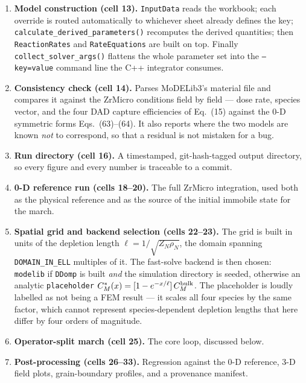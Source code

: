 \documentclass[11pt]{article}
\newcommand{\ZrM}{\textsf{ZrMicro}}
\newcommand{\MoD}{\textsf{MoDELib3}}
\newcommand{\code}[1]{\texttt{\small #1}}
\newcommand{\dref}[1]{Eq.~(#1)}
\newcommand{\drefs}[2]{Eqs.~(#1)--(#2)}
\begin{document}
\begin{enumerate}
\item \textbf{Model construction (cell 13).} \code{InputData} reads the workbook;
each override is routed automatically to whichever sheet already defines the key;
\code{calculate\_derived\_parameters()} recomputes the derived quantities; then
\code{ReactionRates} and \code{RateEquations} are built on top. Finally
\code{collect\_solver\_args()} flattens the whole parameter set into the
\code{--key=value} command line the C++ integrator consumes.

\item \textbf{Consistency check (cell 14).} Parses \MoD{}'s material file and
compares it against the \ZrM{} conditions field by field --- dose rate, species
vector, and the four DAD capture efficiencies of \dref{15} against the 0-D
symmetric forms \drefs{63}{64}. It also reports where the two models are known
\emph{not} to correspond, so that a residual is not mistaken for a bug.

\item \textbf{Run directory (cell 16).} A timestamped, git-hash-tagged output
directory, so every figure and every number is traceable to a commit.

\item \textbf{0-D reference run (cells 18--20).} The full \ZrM{} integration,
used both as the physical reference and as the source of the initial immobile
state for the march.

\item \textbf{Spatial grid and backend selection (cells 22--23).} The grid is
built in units of the depletion length $\ell = 1/\sqrt{Z_N\rho_N}$, the domain
spanning \code{DOMAIN\_IN\_ELL} multiples of it. The fast-solve backend is then
chosen: \code{modelib} if \code{DDomp} is built \emph{and} the simulation
directory is seeded, otherwise an analytic \code{placeholder}
$C_M^{*}(x) = [1-e^{-x/\ell}]\,C_M^{\rm bulk}$. The placeholder is loudly
labelled as not being a FEM result --- it scales all four species by the same
factor, which cannot represent species-dependent depletion lengths that here
differ by four orders of magnitude.

\item \textbf{Operator-split march (cell 25).} The core loop, discussed below.

\item \textbf{Post-processing (cells 26--33).} Regression against the 0-D
reference, 3-D field plots, grain-boundary profiles, and a provenance manifest.
\end{enumerate}
\end{document}

